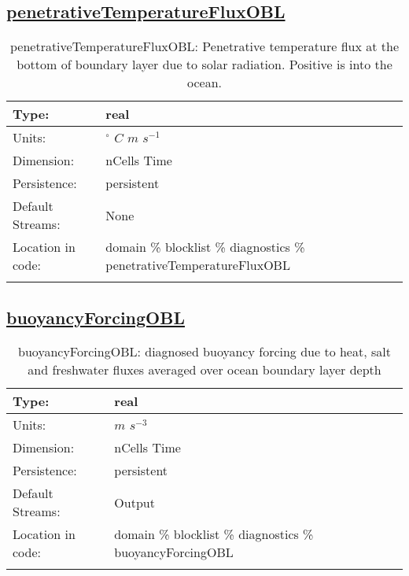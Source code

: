 \subsection[penetrativeTemperatureFluxOBL]{\hyperref[sec:var_tab_diagnostics]{penetrativeTemperatureFluxOBL}}
\label{subsec:var_sec_diagnostics_penetrativeTemperatureFluxOBL}
\begin{center}
\begin{longtable}{| p{2.0in} | p{4.0in} |}
        \hline 
        Type: & real \\
        \hline 
        Units: & $^\circ$ $C$ $m$ $s^{-1}$ \\
        \hline 
        Dimension: & nCells Time \\
        \hline 
        Persistence: & persistent \\
        \hline 
		 Default Streams: & None \\
        \hline 
		 Location in code: & domain \% blocklist \% diagnostics \% penetrativeTemperatureFluxOBL \\
		 \hline 
    \caption{penetrativeTemperatureFluxOBL: Penetrative temperature flux at the bottom of boundary layer due to solar radiation. Positive is into the ocean.}
\end{longtable}
\end{center}
\subsection[buoyancyForcingOBL]{\hyperref[sec:var_tab_diagnostics]{buoyancyForcingOBL}}
\label{subsec:var_sec_diagnostics_buoyancyForcingOBL}
\begin{center}
\begin{longtable}{| p{2.0in} | p{4.0in} |}
        \hline 
        Type: & real \\
        \hline 
        Units: & $m$ $s^{-3}$ \\
        \hline 
        Dimension: & nCells Time \\
        \hline 
        Persistence: & persistent \\
        \hline 
		 Default Streams: & Output  \\
        \hline 
		 Location in code: & domain \% blocklist \% diagnostics \% buoyancyForcingOBL \\
		 \hline 
    \caption{buoyancyForcingOBL: diagnosed buoyancy forcing due to heat, salt and freshwater fluxes averaged over ocean boundary layer depth}
\end{longtable}
\end{center}

